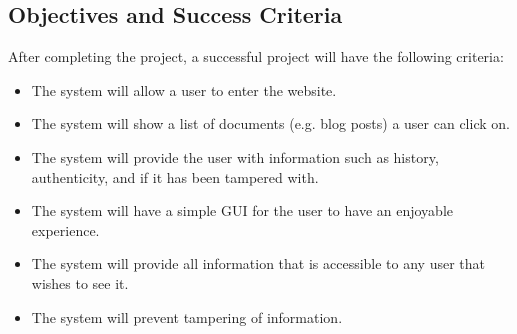 \subsection{Objectives and Success Criteria} %

After completing the project, a successful project will have the following criteria:
\begin{itemize}
	\item The system will allow a user to enter the website.
	\item The system will show a list of documents (e.g. blog posts) a user can click on.
	\item The system will provide the user with information such as history, authenticity, and if it has been tampered with.
	\item The system will have a simple GUI for the user to have an enjoyable experience.
	\item The system will provide all information that is accessible to any user that wishes to see it.
	\item The system will prevent tampering of information.
\end{itemize} %
